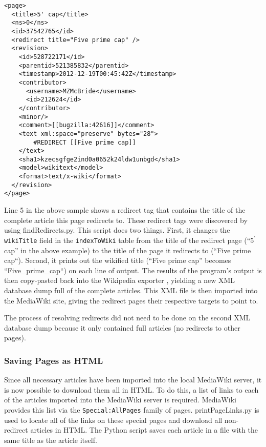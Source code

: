 \begin{lstlisting}
<page>
  <title>5' cap</title>
  <ns>0</ns>
  <id>37542765</id>
  <redirect title="Five prime cap" />
  <revision>
    <id>528722171</id>
    <parentid>521385832</parentid>
    <timestamp>2012-12-19T00:45:42Z</timestamp>
    <contributor>
      <username>MZMcBride</username>
      <id>212624</id>
    </contributor>
    <minor/>
    <comment>[[bugzilla:42616]]</comment>
    <text xml:space="preserve" bytes="28">
        #REDIRECT [[Five prime cap]]
    </text>
    <sha1>kzecsgfge2ind0a0652k24ldw1unbgd</sha1>
    <model>wikitext</model>
    <format>text/x-wiki</format>
  </revision>
</page>
\end{lstlisting}

Line 5 in the above sample shows a redirect tag that contains the title of the complete article this page redirects to.
These redirect tags were discovered by using findRedirects.py.
This script does two things.
First, it changes the {\tt wikiTitle} field in the {\tt indexToWiki} table from the title of the redirect page (``$5^\prime$ cap'' in the above example) to the title of the page it redirects to (``Five prime cap``).
Second, it prints out the wikified title (``Five prime cap'' becomes ``Five\_prime\_cap``) on each line of output.
The results of the program's output is then copy-pasted back into the Wikipedia exporter \cite{wiki-exporter}, yielding a new XML database dump full of the complete articles.
This XML file is then imported into the MediaWiki site, giving the redirect pages their respective targets to point to.

The process of resolving redirects did not need to be done on the second XML database dump because it only contained full articles (no redirects to other pages).

\subsubsection{Saving Pages as HTML}

Since all necessary articles have been imported into the local MediaWiki server, it is now possible to download them all in HTML.
To do this, a list of links to each of the articles imported into the MediaWiki server is required.
MediaWiki provides this list via the {\tt Special:AllPages} family of pages.
printPageLinks.py is used to locate all of the links on these special pages and download all non-redirect articles in HTML.
The Python script saves each article in a file with the same title as the article itself.

